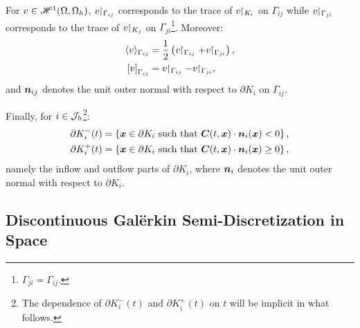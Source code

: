 For $v \in \mathscr{H}^{1}(\Omega, \Omega_h)$, $v \!\!\restriction_{\Gamma_{ij}}$ corresponds to the trace of $v \!\!\restriction_{K_i}$ on $\Gamma_{ij}$ while $v \!\!\restriction_{\Gamma_{ji}}$ corresponds to the trace of $v \!\!\restriction_{K_j}$ on $\Gamma_{ji}$\footnote{$\Gamma_{ji} = \Gamma_{ij}$.}. Moreover:
\begin{align}
    \langle v \rangle_{\Gamma_{ij}} &= \frac{1}{2} \left( v \Restriction_{\Gamma_{ij}} + v \Restriction_{\Gamma_{ji}} \right), \\
    \left[ v \right]_{\Gamma_{ij}} &= v \Restriction_{\Gamma_{ij}} - v \Restriction_{\Gamma_{ji}},
\end{align}
and $\bm{n}_{ij}$ denotes the unit outer normal with respect to $\partial K_i$ on $\Gamma_{ij}$.

Finally, for $i \in \mathcal{J}_h$\footnote{The dependence of $\partial K_i^-(t)$ and $\partial K_i^+(t)$ on $t$ will be implicit in what follows.}:
\begin{align}
    \partial K_i^-(t) = \left\{ \bm{x} \in \partial K_i \text{ such that } \bm{C}(t, \bm{x}) \cdot \bm{n}_i(\bm{x}) < 0 \right\}, \\
    \partial K_i^+(t) = \left\{ \bm{x} \in \partial K_i \text{ such that } \bm{C}(t, \bm{x}) \cdot \bm{n}_i(\bm{x}) \geq 0 \right\},
\end{align}
namely the inflow and outflow parts of $\partial K_i$, where $\bm{n}_i$ denotes the unit outer normal with respect to $\partial K_i$.

\newpage
\subsection{Discontinuous Galërkin Semi-Discretization in Space}

